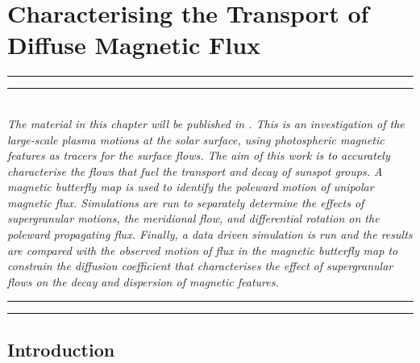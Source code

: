 

\chapter[Magnetic Flux Transport]{Characterising the Transport of Diffuse Magnetic Flux} %
\label{chapter:results_diffusion}



    \graphicspath{{7/figures/EPS/}{7/figures/}}

\glsresetall


\hrule height 1mm
\vspace{0.5mm}
\hrule height 0.4mm 
\noindent 
\\ {\it 
The material in this chapter will be published in \emph{}. This is an investigation of the large-scale plasma motions at the solar surface, using photospheric magnetic features as tracers for the surface flows. The aim of this work is to accurately characterise the flows that fuel the transport and decay of sunspot groups. A magnetic butterfly map is used to identify the poleward motion of unipolar magnetic flux. Simulations are run to separately determine the effects of supergranular motions, the meridional flow, and differential rotation on the poleward propagating flux. Finally, a data driven simulation is run and the results are compared with the observed motion of flux in the magnetic butterfly map to constrain the diffusion coefficient that characterises the effect of supergranular flows on the  decay and dispersion of magnetic features.
}
\\ 
\hrule height 0.4mm
\vspace{0.5mm}
\hrule height 1mm 
\vspace{1.5cm}

 \section{Introduction}

